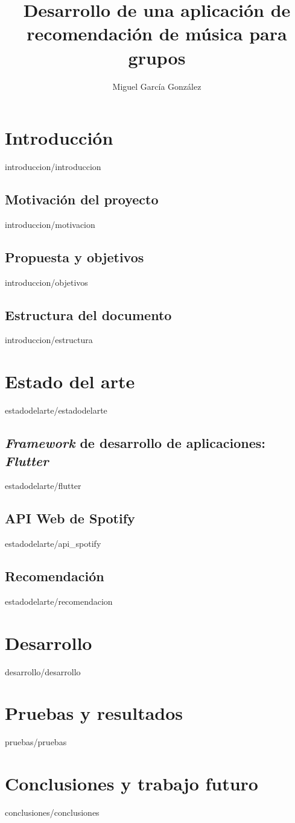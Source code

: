 \documentclass[epsbased,copyright,final,printable,covers,extendedindex,firstnumbered,tfm,gnuplot]{tfgtfmthesisuam}
\title{Desarrollo de una aplicación de recomendación de música para grupos}
\subtitle{}
\author{Miguel García González}
\begin{document}
\chapter{Introducción\label{CAP:INTRODUCCION}}{introduccion/introduccion}
  \section{Motivación del proyecto\label{SEC:MOTIVACION}}{introduccion/motivacion}
  \section{Propuesta y objetivos\label{SEC:OBJETIVOS}}{introduccion/objetivos}
  \section{Estructura del documento\label{SEC:ESTRUCTURA}}{introduccion/estructura}

\chapter{Estado del arte\label{CAP:ESTADODELARTE}}{estadodelarte/estadodelarte}
  \section{\textit{Framework} de desarrollo de aplicaciones: \textit{Flutter}\label{SEC:FLUTTER}}{estadodelarte/flutter}
  \section{API Web de Spotify\label{SEC:API_SPOTIFY}}{estadodelarte/api_spotify}
  \section{Recomendación\label{SEC:RECOMENDACION}}{estadodelarte/recomendacion}

\chapter{Desarrollo\label{CAP:DESARROLLO}}{desarrollo/desarrollo}

\chapter{Pruebas y resultados\label{CAP:PRUEBAS}}{pruebas/pruebas}

\chapter{Conclusiones y trabajo futuro\label{CAP:CONCLUSIONES}}{conclusiones/conclusiones}

\end{document}
